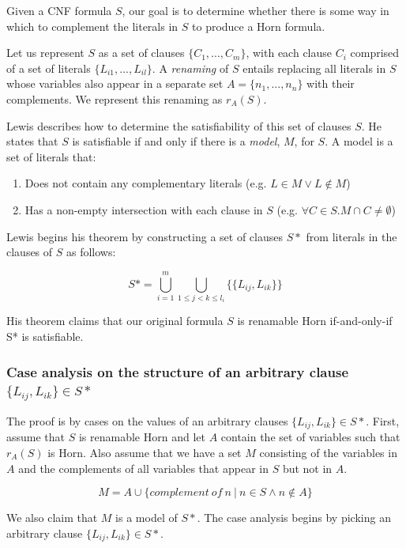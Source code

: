 \documentclass{article}
\begin{document}
\noindent Given a CNF formula $S$, our goal is to determine whether there is some way in which to complement the literals in $S$ to produce a Horn formula.

\medskip
\noindent Let us represent $S$ as a set of clauses $\{C_1, ..., C_m\}$, with each clause $C_i$ comprised of a set of literals $\{L_{i1}, ..., L_{il}\}$. A \emph{renaming} of $S$ entails replacing all literals in $S$ whose variables also appear in a separate set $A = \{n_1, ..., n_n\}$ with their complements. We represent this renaming as $r_A(S)$.

\medskip
\noindent Lewis describes how to determine the satisfiability of this set of clauses $S$. He states that $S$ is satisfiable if and only if there is a \emph{model}, $M$, for $S$. A model is a set of literals that:

\begin{enumerate}
  \item Does not contain any complementary literals (e.g. $L \in M \lor L \notin M$)
  \item Has a non-empty intersection with each clause in $S$ (e.g. $\forall C \in S.M \cap C \neq \emptyset$) 
\end{enumerate}

\medskip
\noindent Lewis begins his theorem by constructing a set of clauses $S*$ from literals in the clauses of $S$ as follows:

$$
S* = \bigcup\limits_{i=1}^m \bigcup\limits_{1 \leq j < k \leq l_{i}} \{\{L_{ij}, L_{ik}\}\}
$$

\noindent His theorem claims that our original formula $S$ is renamable Horn if-and-only-if S* is satisfiable.

\medskip
\subsubsection{Case analysis on the structure of an arbitrary clause $\{L_{ij}, L_{ik}\} \in S*$}

\medskip
\noindent The proof is by cases on the values of an arbitrary clauses $\{L_{ij}, L_{ik}\} \in S*$. First, assume that $S$ is renamable Horn and let $A$ contain the set of variables such that $r_A(S)$ is Horn. Also assume that we have a set $M$ consisting of the variables in $A$ and the complements of all variables that appear in $S$ but not in $A$.

$$
M = A \cup \{complement~of~n~|~n \in S \land n \notin A\}
$$

\noindent We also claim that $M$ is a model of $S*$. The case analysis begins by picking an arbitrary clause $\{L_{ij}, L_{ik}\} \in S*$.
\end{document}
